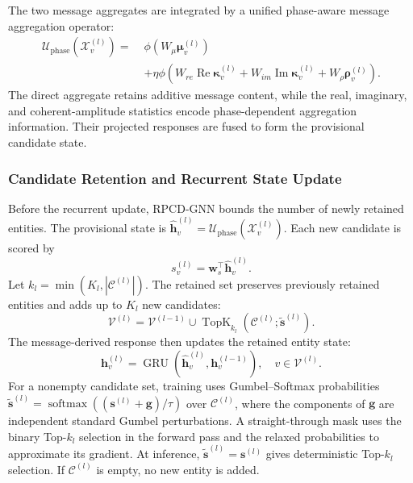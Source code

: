 \documentclass[a4paper,fleqn]{cas-dc}
\begin{document}
The two message aggregates are integrated by a unified phase-aware message aggregation operator:
\begin{equation}
\begin{split}
\mathcal{U}_{\mathrm{phase}}
\left(\mathcal{X}_{v}^{(l)}\right)
=\;&
\phi\left(
W_{\mu}\boldsymbol{\mu}_{v}^{(l)}
\right)\\
&+
\eta
\phi\left(
W_{re}\operatorname{Re}
\boldsymbol{\kappa}_{v}^{(l)}
+
W_{im}\operatorname{Im}
\boldsymbol{\kappa}_{v}^{(l)}
+
W_{\rho}\boldsymbol{\rho}_{v}^{(l)}
\right).
\end{split}
\label{eq:unified-relation-phase-operator}
\end{equation}
The direct aggregate retains additive message content, while the real, imaginary, and coherent-amplitude statistics encode phase-dependent aggregation information. Their projected responses are fused to form the provisional candidate state.

\subsubsection{Candidate Retention and Recurrent State Update}

Before the recurrent update, RPCD-GNN bounds the number of newly retained entities. The provisional state is $\widehat{\mathbf{h}}_{v}^{(l)}=\mathcal{U}_{\mathrm{phase}}(\mathcal{X}_{v}^{(l)})$. Each new candidate is scored by
\begin{equation}
s_{v}^{(l)}
=
\mathbf{w}_{s}^{\top}
\widehat{\mathbf{h}}_{v}^{(l)}.
\label{eq:candidate-selection-score}
\end{equation}
Let $k_l=\min(K_l,|\mathcal{C}^{(l)}|)$. The retained set preserves previously retained entities and adds up to $K_l$ new candidates:
\begin{equation}
\mathcal{V}^{(l)}
=
\mathcal{V}^{(l-1)}
\cup
\operatorname{TopK}_{k_l}
\left(
\mathcal{C}^{(l)};
\widetilde{\mathbf{s}}^{(l)}
\right).
\label{eq:topk-frontier-update}
\end{equation}
The message-derived response then updates the retained entity state:
\begin{equation}
\mathbf{h}_{v}^{(l)}
=
\operatorname{GRU}\left(
\widehat{\mathbf{h}}_{v}^{(l)},
\mathbf{h}_{v}^{(l-1)}
\right),
\quad
v\in\mathcal{V}^{(l)}.
\label{eq:recurrent-entity-update}
\end{equation}
For a nonempty candidate set, training uses Gumbel--Softmax probabilities $\widetilde{\mathbf{s}}^{(l)}=\operatorname{softmax}((\mathbf{s}^{(l)}+\mathbf{g})/\tau)$ over $\mathcal{C}^{(l)}$, where the components of $\mathbf{g}$ are independent standard Gumbel perturbations. A straight-through mask uses the binary Top-$k_l$ selection in the forward pass and the relaxed probabilities to approximate its gradient. At inference, $\widetilde{\mathbf{s}}^{(l)}=\mathbf{s}^{(l)}$ gives deterministic Top-$k_l$ selection. If $\mathcal{C}^{(l)}$ is empty, no new entity is added.
\end{document}
